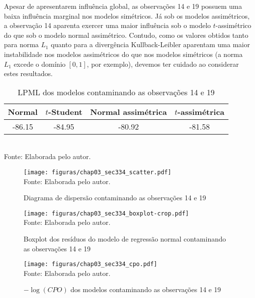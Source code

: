 Apesar de apresentarem influência global, as observações 14 e 19 possuem uma baixa influência marginal nos modelos simétricos. Já sob os modelos assimétricos, a observação 14 aparenta exercer uma maior influência sob o modelo $t$-assimétrico do que sob o modelo normal assimétrico. Contudo, como os valores obtidos tanto para norma $L_1$ quanto para a divergência Kullback-Leibler aparentam uma maior instabilidade nos modelos assimétricos do que nos modelos simétricos (a norma $L_1$ excede o domínio $[0,1]$, por exemplo), devemos ter cuidado ao considerar estes resultados.

\begin{table}[!h]
\begin{center}
\caption{LPML dos modelos contaminando as observações 14 e 19}
\label{fig:chap03_sec334_lpml}
\begin{tabular}{cccc}
 Normal & $t$-Student & Normal assimétrica  & $t$-assimétrica \\ \hline
-86.15 & -84.95 & -80.92 & -81.58 \\ \hline
\end{tabular}
\\
Fonte: Elaborada pelo autor.
\end{center}
\end{table}


\begin{figure}[H]
\begin{center}
\caption{Diagrama de dispersão contaminando as observações 14 e 19}
\label{fig:chap03_sec334_scatter}
\texttt{[image: figuras/chap03\_sec334\_scatter.pdf]}
\\ Fonte: Elaborada pelo autor.
\end{center}
\end{figure}

\begin{figure}[H]
\begin{center}
\caption{Boxplot dos resíduos do modelo de regressão normal contaminando as observações 14 e 19}
\label{fig:chap03_sec334_boxplot}
\texttt{[image: figuras/chap03\_sec334\_boxplot-crop.pdf]}
\\ Fonte: Elaborada pelo autor.
\end{center}
\end{figure}

\begin{figure}[H]
\begin{center}
\caption{$-\log(CPO)$ dos modelos contaminando as observações 14 e 19}
\label{fig:chap03_sec334_cpo}
\texttt{[image: figuras/chap03\_sec334\_cpo.pdf]}
\\ Fonte: Elaborada pelo autor.
\end{center}
\end{figure}

